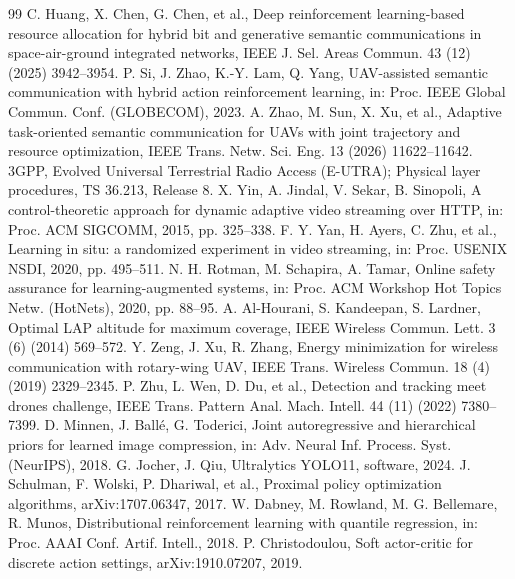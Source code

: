 \documentclass[final,3p,times,twocolumn]{elsarticle}
\begin{document}
\begin{thebibliography}{99}
 C. Huang, X. Chen, G. Chen, et al., Deep reinforcement learning-based
resource allocation for hybrid bit and generative semantic communications in space-air-ground integrated networks,
IEEE J. Sel. Areas Commun. 43 (12) (2025) 3942--3954.
 P. Si, J. Zhao, K.-Y. Lam, Q. Yang, UAV-assisted semantic communication with hybrid action
reinforcement learning, in: Proc. IEEE Global Commun. Conf. (GLOBECOM), 2023.
 A. Zhao, M. Sun, X. Xu, et al., Adaptive task-oriented
semantic communication for UAVs with joint trajectory and resource optimization, IEEE Trans. Netw. Sci. Eng. 13 (2026)
11622--11642.
 3GPP, Evolved Universal Terrestrial Radio Access (E-UTRA); Physical layer procedures, TS 36.213,
Release 8.
 X. Yin, A. Jindal, V. Sekar, B. Sinopoli, A control-theoretic approach for dynamic adaptive video
streaming over HTTP, in: Proc. ACM SIGCOMM, 2015, pp. 325--338.
 F. Y. Yan, H. Ayers, C. Zhu, et al., Learning in situ:
a randomized experiment in video streaming, in: Proc. USENIX NSDI, 2020, pp. 495--511.
 N. H. Rotman, M. Schapira, A. Tamar, Online safety assurance for learning-augmented systems, in:
Proc. ACM Workshop Hot Topics Netw. (HotNets), 2020, pp. 88--95.
 A. Al-Hourani, S. Kandeepan, S. Lardner, Optimal LAP altitude for maximum coverage, IEEE
Wireless Commun. Lett. 3 (6) (2014) 569--572.
 Y. Zeng, J. Xu, R. Zhang, Energy minimization for wireless communication with rotary-wing UAV, IEEE
Trans. Wireless Commun. 18 (4) (2019) 2329--2345.
 P. Zhu, L. Wen, D. Du, et al., Detection and tracking meet drones
challenge, IEEE Trans. Pattern Anal. Mach. Intell. 44 (11) (2022) 7380--7399.
 D. Minnen, J. Ball\'e, G. Toderici, Joint autoregressive and hierarchical priors for learned image
compression, in: Adv. Neural Inf. Process. Syst. (NeurIPS), 2018.
 G. Jocher, J. Qiu, Ultralytics YOLO11, software, 2024.
 J. Schulman, F. Wolski, P. Dhariwal, et al., Proximal policy optimization
algorithms, arXiv:1707.06347, 2017.
 W. Dabney, M. Rowland, M. G. Bellemare, R. Munos, Distributional reinforcement learning with
quantile regression, in: Proc. AAAI Conf. Artif. Intell., 2018.
 P. Christodoulou, Soft actor-critic for discrete action settings, arXiv:1910.07207, 2019.
\end{thebibliography}
\end{document}
